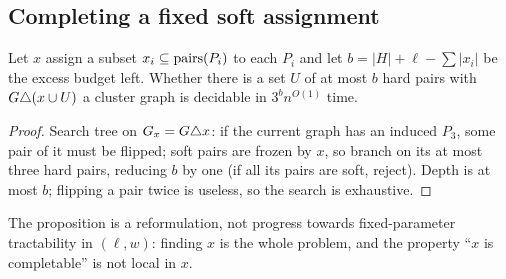 \subsection{Completing a fixed soft assignment}
\begin{proposition}\label{prop:B}
Let $x$ assign a subset $x_i\subseteq\mathrm{pairs}(P_i)$ to each $P_i$ and let $b=|H|+\ell-\sum|x_i|$ be the excess budget left. Whether there is a set $U$ of at most $b$ hard pairs with $G\triangle(x\cup U)$ a cluster graph is decidable in $3^{b}n^{O(1)}$ time.
\end{proposition}
\begin{proof}
Search tree on $G_x=G\triangle x$: if the current graph has an induced $P_3$, some pair of it must be flipped; soft pairs are frozen by $x$, so branch on its at most three hard pairs, reducing $b$ by one (if all its pairs are soft, reject). Depth is at most $b$; flipping a pair twice is useless, so the search is exhaustive.
\end{proof}
The proposition is a reformulation, not progress towards fixed-parameter tractability in $(\ell,w)$: finding $x$ is the whole problem, and the property ``$x$ is completable'' is not local in $x$.
